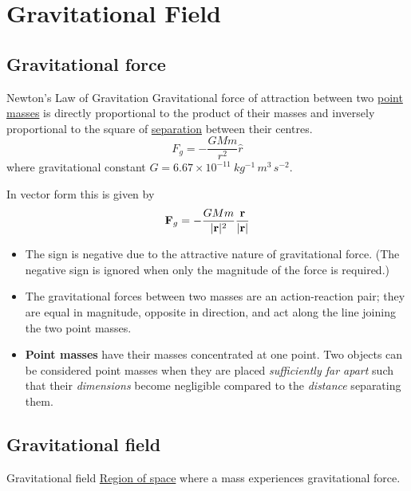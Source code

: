 \section{Gravitational Field}
\subsection{Gravitational force}
\begin{defn}{Newton's Law of Gravitation}{}
Gravitational force of attraction between two \underline{point masses} is directly proportional to the product of their masses and inversely proportional to the square of \underline{separation} between their centres.
\begin{equation}
F_g=-\frac{GMm}{r^2}\hat{r}
\end{equation}
where gravitational constant $G = 6.67 \times 10^{-11}\:\unit{kg^{-1}\,m^3\,s^{-2}}$.

In vector form this is given by
\[ \vb{F}_g=-\frac{GMm}{|\vb{r}|^2}\frac{\vb{r}}{|\vb{r}|} \]
\end{defn} 

\begin{itemize}
\item The sign is negative due to the attractive nature of gravitational force. (The negative sign is ignored when only the magnitude of the force is required.)
\item The gravitational forces between two masses are an action-reaction pair; they are equal in magnitude, opposite in direction, and act along the line joining the two point masses.
\item \textbf{Point masses} have their masses concentrated at one point. Two objects can be considered point masses when they are placed \emph{sufficiently far apart} such that their \emph{dimensions} become negligible compared to the \emph{distance} separating them.
\end{itemize}

\subsection{Gravitational field}
\begin{defn}{Gravitational field}{}
\underline{Region of space} where a mass experiences gravitational force.
\end{defn}

